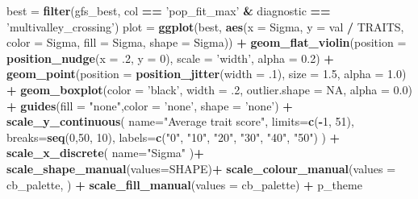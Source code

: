 \documentclass[]{book}
\newenvironment{Shaded}{\begin{snugshade}}{\end{snugshade}}
\newcommand{\DataTypeTok}[1]{\textcolor[rgb]{0.13,0.29,0.53}{#1}}
\newcommand{\DecValTok}[1]{\textcolor[rgb]{0.00,0.00,0.81}{#1}}
\newcommand{\FloatTok}[1]{\textcolor[rgb]{0.00,0.00,0.81}{#1}}
\newcommand{\KeywordTok}[1]{\textcolor[rgb]{0.13,0.29,0.53}{\textbf{#1}}}
\newcommand{\NormalTok}[1]{#1}
\newcommand{\OperatorTok}[1]{\textcolor[rgb]{0.81,0.36,0.00}{\textbf{#1}}}
\newcommand{\OtherTok}[1]{\textcolor[rgb]{0.56,0.35,0.01}{#1}}
\newcommand{\StringTok}[1]{\textcolor[rgb]{0.31,0.60,0.02}{#1}}
\begin{document}
\begin{Shaded}
\begin{Highlighting}[]
\NormalTok{best =}\StringTok{ }\KeywordTok{filter}\NormalTok{(gfs_best, col }\OperatorTok{==}\StringTok{ 'pop_fit_max'} \OperatorTok{&}\StringTok{ }\NormalTok{diagnostic }\OperatorTok{==}\StringTok{ 'multivalley_crossing'}\NormalTok{)}
\NormalTok{plot =}\StringTok{  }\KeywordTok{ggplot}\NormalTok{(best, }\KeywordTok{aes}\NormalTok{(}\DataTypeTok{x =}\NormalTok{ Sigma, }\DataTypeTok{y =}\NormalTok{ val }\OperatorTok{/}\StringTok{ }\NormalTok{TRAITS, }\DataTypeTok{color =}\NormalTok{ Sigma, }\DataTypeTok{fill =}\NormalTok{ Sigma, }\DataTypeTok{shape =}\NormalTok{ Sigma)) }\OperatorTok{+}
\StringTok{          }\KeywordTok{geom_flat_violin}\NormalTok{(}\DataTypeTok{position =} \KeywordTok{position_nudge}\NormalTok{(}\DataTypeTok{x =} \FloatTok{.2}\NormalTok{, }\DataTypeTok{y =} \DecValTok{0}\NormalTok{), }\DataTypeTok{scale =} \StringTok{'width'}\NormalTok{, }\DataTypeTok{alpha =} \FloatTok{0.2}\NormalTok{) }\OperatorTok{+}
\StringTok{          }\KeywordTok{geom_point}\NormalTok{(}\DataTypeTok{position =} \KeywordTok{position_jitter}\NormalTok{(}\DataTypeTok{width =} \FloatTok{.1}\NormalTok{), }\DataTypeTok{size =} \FloatTok{1.5}\NormalTok{, }\DataTypeTok{alpha =} \FloatTok{1.0}\NormalTok{) }\OperatorTok{+}
\StringTok{          }\KeywordTok{geom_boxplot}\NormalTok{(}\DataTypeTok{color =} \StringTok{'black'}\NormalTok{, }\DataTypeTok{width =} \FloatTok{.2}\NormalTok{, }\DataTypeTok{outlier.shape =} \OtherTok{NA}\NormalTok{, }\DataTypeTok{alpha =} \FloatTok{0.0}\NormalTok{) }\OperatorTok{+}
\StringTok{          }\KeywordTok{guides}\NormalTok{(}\DataTypeTok{fill =} \StringTok{"none"}\NormalTok{,}\DataTypeTok{color =} \StringTok{'none'}\NormalTok{, }\DataTypeTok{shape =} \StringTok{'none'}\NormalTok{) }\OperatorTok{+}
\StringTok{          }\KeywordTok{scale_y_continuous}\NormalTok{(}
            \DataTypeTok{name=}\StringTok{"Average trait score"}\NormalTok{,}
            \DataTypeTok{limits=}\KeywordTok{c}\NormalTok{(}\OperatorTok{-}\DecValTok{1}\NormalTok{, }\DecValTok{51}\NormalTok{),}
            \DataTypeTok{breaks=}\KeywordTok{seq}\NormalTok{(}\DecValTok{0}\NormalTok{,}\DecValTok{50}\NormalTok{, }\DecValTok{10}\NormalTok{),}
            \DataTypeTok{labels=}\KeywordTok{c}\NormalTok{(}\StringTok{"0"}\NormalTok{, }\StringTok{"10"}\NormalTok{, }\StringTok{"20"}\NormalTok{, }\StringTok{"30"}\NormalTok{, }\StringTok{"40"}\NormalTok{, }\StringTok{"50"}\NormalTok{)}
\NormalTok{          ) }\OperatorTok{+}
\StringTok{          }\KeywordTok{scale_x_discrete}\NormalTok{(}
            \DataTypeTok{name=}\StringTok{"Sigma"}
\NormalTok{          )}\OperatorTok{+}
\StringTok{          }\KeywordTok{scale_shape_manual}\NormalTok{(}\DataTypeTok{values=}\NormalTok{SHAPE)}\OperatorTok{+}
\StringTok{          }\KeywordTok{scale_colour_manual}\NormalTok{(}\DataTypeTok{values =}\NormalTok{ cb_palette, ) }\OperatorTok{+}
\StringTok{          }\KeywordTok{scale_fill_manual}\NormalTok{(}\DataTypeTok{values =}\NormalTok{ cb_palette) }\OperatorTok{+}
\StringTok{          }\NormalTok{p_theme}


\end{Highlighting}
\end{Shaded}
\end{document}
